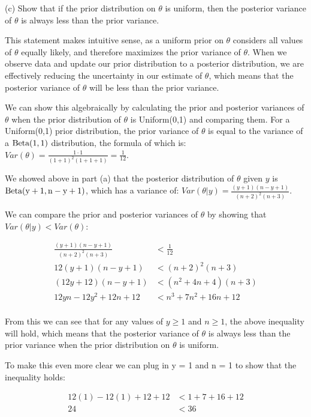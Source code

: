 \documentclass[12pt]{article}
\begin{document}
(c) Show that if the prior distribution on $\theta$ is uniform, then the posterior variance of $\theta$ is always less than the prior variance.

This statement makes intuitive sense, as a uniform prior on $\theta$ considers all values of $\theta$ equally likely, and therefore maximizes
the prior variance of $\theta$. When we observe data and update our prior distribution to a posterior distribution, we are effectively reducing
the uncertainty in our estimate of $\theta$, which means that the posterior variance of $\theta$ will be less than the prior variance.

We can show this algebraically by calculating the prior and posterior variances of $\theta$ when the prior distribution of
$\theta$ is Uniform(0,1) and comparing them. For a Uniform(0,1) prior distribution, the prior variance of $\theta$ is equal
to the variance of a $\rm Beta(1,1)$ distribution, the formula of which is: $Var(\theta) = \frac{1 \cdot 1}{(1 + 1)^2(1 + 1 + 1)} = \frac{1}{12}$.

We showed above in part (a) that the posterior distribution of $\theta$ given $y$ is $\rm Beta(y + 1, n - y + 1)$, which has a variance of:
$Var(\theta | y) = \frac{(y + 1)(n - y + 1)}{(n + 2)^2(n + 3)}$. 

We can compare the prior and posterior variances of $\theta$ by showing that $Var(\theta | y) < Var(\theta)$:

\begin{align*}
\frac{(y + 1)(n - y + 1)}{(n + 2)^2(n + 3)} &< \frac{1}{12} \\
12(y + 1)(n - y + 1) &< (n + 2)^2(n + 3) \\
(12y + 12)(n - y + 1) &< (n^2 + 4n + 4)(n + 3) \\
12yn - 12y^2 + 12n + 12 &< n^3 + 7n^2 + 16n + 12 \\
\end{align*}

From this we can see that for any values of $y \geq 1$ and $n \geq 1$, the above inequality will hold,
which means that the posterior variance of $\theta$ is always less than the prior variance when 
the prior distribution on $\theta$ is uniform.

To make this even more clear we can plug in y = 1 and n = 1 to show that the inequality holds:

\begin{align*}
12(1) - 12(1) + 12 + 12 &< 1 + 7 + 16 + 12 \\
24 &< 36 \\
\end{align*}
\end{document}
